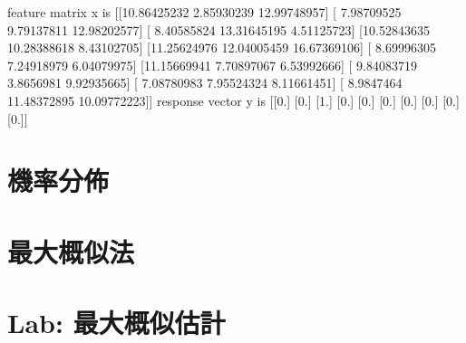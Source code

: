 \documentclass[letterpaper,10pt,english]{sphinxmanual}
\begin{document}
\begin{sphinxVerbatim}[commandchars=\\\{\}]
 \PYG{p}{[}\PYG{p}{]}
 \PYG{p}{[}\PYG{p}{]}
\end{sphinxVerbatim}

\begin{sphinxVerbatim}[commandchars=\\\{\}]
feature matrix x is 
 [[10.86425232  2.85930239 12.99748957]
 [ 7.98709525  9.79137811 12.98202577]
 [ 8.40585824 13.31645195  4.51125723]
 [10.52843635 10.28388618  8.43102705]
 [11.25624976 12.04005459 16.67369106]
 [ 8.69996305  7.24918979  6.04079975]
 [11.15669941  7.70897067  6.53992666]
 [ 9.84083719  3.8656981   9.92935665]
 [ 7.08780983  7.95524324  8.11661451]
 [ 8.9847464  11.48372895 10.09772223]]
response vector y is 
 [[0.]
 [0.]
 [1.]
 [0.]
 [0.]
 [0.]
 [0.]
 [0.]
 [0.]
 [0.]]
\end{sphinxVerbatim}


\chapter{機率分佈}
\label{\detokenize{notebook/probability-distribution:id1}}\label{\detokenize{notebook/probability-distribution::doc}}

\chapter{最大概似法}
\label{\detokenize{notebook/maximum-likelihood:id1}}\label{\detokenize{notebook/maximum-likelihood::doc}}

\chapter{Lab: 最大概似估計}
\label{\detokenize{notebook/lab-torch-mle:lab}}\label{\detokenize{notebook/lab-torch-mle::doc}}
\begin{sphinxVerbatim}[commandchars=\\\{\}]
 
\end{sphinxVerbatim}
\end{document}
